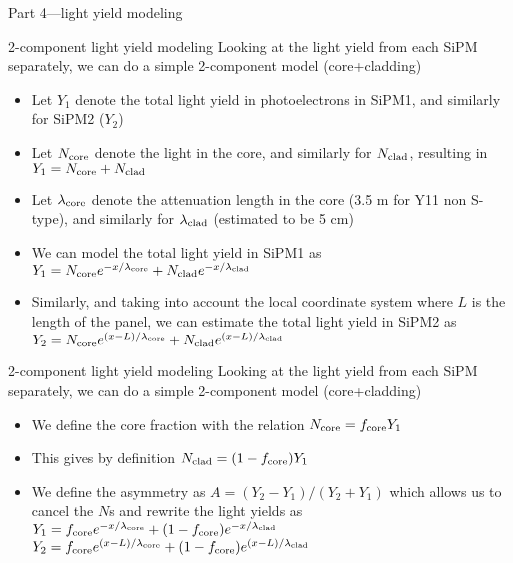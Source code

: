 \documentclass[compress,8pt]{beamer} %
\begin{document}

\begin{frame}
Part 4---light yield modeling
\end{frame}


\begin{frame}{2-component light yield modeling}
Looking at the light yield from each SiPM separately, we can do a simple 2-component model (core+cladding)
\begin{itemize}
\item Let $Y_1$ denote the total light yield in photoelectrons in SiPM1, and similarly for SiPM2 ($Y_2$)
\item Let $N_{\textnormal{core}}$ denote the light in the core,
and similarly for $N_{\textnormal{clad}}$, resulting in \\
$Y_1 = N_{\textnormal{core}} + N_{\textnormal{clad}}$
\item Let $\lambda_{\textnormal{core}}$ denote the attenuation length in the core (3.5 m for Y11 non S-type),
and similarly for $\lambda_{\textnormal{clad}}$ (estimated to be 5 cm)
\item We can model the total light yield in SiPM1 as
$Y_1 = N_{\textnormal{core}} e^{-x/\lambda_{\textnormal{core}}} + N_{\textnormal{clad}}e^{-x/\lambda_{\textnormal{clad}}}$
\item Similarly, and taking into account the local coordinate system where $L$ is the length of the panel,
we can estimate the total light yield in SiPM2 as \\
$Y_2 = N_{\textnormal{core}}e^{(x-L)/\lambda_{\textnormal{core}}} + N_{\textnormal{clad}}e^{(x-L)/\lambda_{\textnormal{clad}}}$
\end{itemize}
\end{frame}



\begin{frame}{2-component light yield modeling}
Looking at the light yield from each SiPM separately, we can do a simple 2-component model (core+cladding)
\begin{itemize}
\item We define the core fraction with the relation $N_{\textnormal{core}} = f_{\textnormal{core}}Y_1$
\item This gives by definition $N_{\textnormal{clad}} = (1-f_{\textnormal{core}})Y_1$
\item We define the asymmetry as $A = (Y_2-Y_1)/(Y_2+Y_1)$ which allows us to cancel the $N$s
and rewrite the light yields as \\
$Y_1 = f_{\textnormal{core}}e^{-x/\lambda_{\textnormal{core}}} + (1-f_{\textnormal{core}})e^{-x/\lambda_{\textnormal{clad}}}$ \\
$Y_2 = f_{\textnormal{core}}e^{(x-L)/\lambda_{\textnormal{core}}} + (1-f_{\textnormal{core}})e^{(x-L)/\lambda_{\textnormal{clad}}}$
\end{itemize}
\end{frame}
\end{document}
